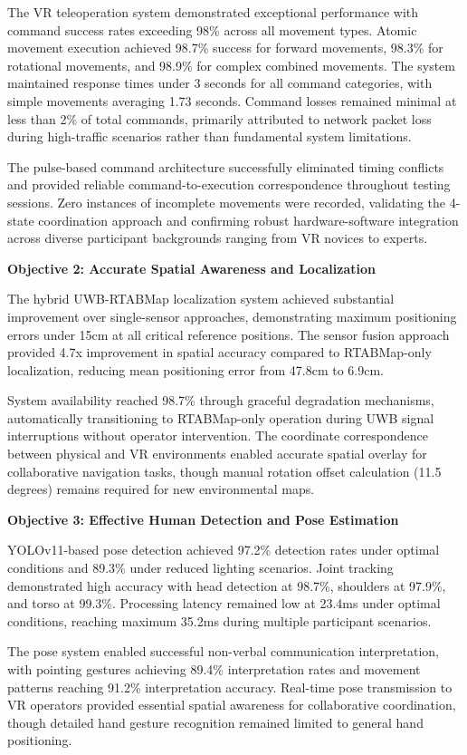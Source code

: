 The VR teleoperation system demonstrated exceptional performance with command success rates exceeding 98\% across all movement types. Atomic movement execution achieved 98.7\% success for forward movements, 98.3\% for rotational movements, and 98.9\% for complex combined movements. The system maintained response times under 3 seconds for all command categories, with simple movements averaging 1.73 seconds. Command losses remained minimal at less than 2\% of total commands, primarily attributed to network packet loss during high-traffic scenarios rather than fundamental system limitations.

The pulse-based command architecture successfully eliminated timing conflicts and provided reliable command-to-execution correspondence throughout testing sessions. Zero instances of incomplete movements were recorded, validating the 4-state coordination approach and confirming robust hardware-software integration across diverse participant backgrounds ranging from VR novices to experts.

\textbf{Objective 2: Accurate Spatial Awareness and Localization}

The hybrid UWB-RTABMap localization system achieved substantial improvement over single-sensor approaches, demonstrating maximum positioning errors under 15cm at all critical reference positions. The sensor fusion approach provided 4.7x improvement in spatial accuracy compared to RTABMap-only localization, reducing mean positioning error from 47.8cm to 6.9cm.

System availability reached 98.7\% through graceful degradation mechanisms, automatically transitioning to RTABMap-only operation during UWB signal interruptions without operator intervention. The coordinate correspondence between physical and VR environments enabled accurate spatial overlay for collaborative navigation tasks, though manual rotation offset calculation (11.5 degrees) remains required for new environmental maps.

\textbf{Objective 3: Effective Human Detection and Pose Estimation}

YOLOv11-based pose detection achieved 97.2\% detection rates under optimal conditions and 89.3\% under reduced lighting scenarios. Joint tracking demonstrated high accuracy with head detection at 98.7\%, shoulders at 97.9\%, and torso at 99.3\%. Processing latency remained low at 23.4ms under optimal conditions, reaching maximum 35.2ms during multiple participant scenarios.

The pose system enabled successful non-verbal communication interpretation, with pointing gestures achieving 89.4\% interpretation rates and movement patterns reaching 91.2\% interpretation accuracy. Real-time pose transmission to VR operators provided essential spatial awareness for collaborative coordination, though detailed hand gesture recognition remained limited to general hand positioning.

